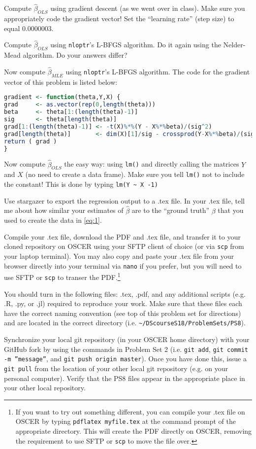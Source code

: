\documentclass[12pt,english]{exam}
\begin{document}
\begin{questions}
\question Compute $\hat{\beta}_{OLS}$ using gradient descent (as we went over in class). Make sure you appropriately code the gradient vector! Set the ``learning rate'' (step size) to equal 0.0000003.

\question Compute $\hat{\beta}_{OLS}$ using \texttt{nloptr}'s L-BFGS algorithm. Do it again using the Nelder-Mead algorithm. Do your answers differ?

\question Now compute $\hat{\beta}_{MLE}$ using \texttt{nloptr}'s L-BFGS algorithm. The code for the gradient vector of this problem is listed below:
\begin{lstlisting}[language=R]
gradient <- function(theta,Y,X) {
grad     <- as.vector(rep(0,length(theta)))
beta     <- theta[1:(length(theta)-1)]
sig      <- theta[length(theta)]
grad[1:(length(theta)-1)] <- -t(X)%*%(Y - X%*%beta)/(sig^2)
grad[length(theta)]       <- dim(X)[1]/sig - crossprod(Y-X%*%beta)/(sig^3)
return ( grad )
}
\end{lstlisting}

\question Now compute $\hat{\beta}_{OLS}$ the easy way: using \texttt{lm()} and directly calling the matrices $Y$ and $X$ (no need to create a data frame). Make sure you tell \texttt{lm()} not to include the constant! This is done by typing \texttt{lm(Y \textasciitilde{} X -1)}

Use stargazer to export the regression output to a .tex file. In your .tex file, tell me about how similar your estimates of $\hat{\beta}$ are to the ``ground truth'' $\beta$ that you used to create the data in \eqref{eq:1}.

\question Compile your .tex file, download the PDF and .tex file, and transfer it to your cloned repository on OSCER using your SFTP client of choice (or via \texttt{scp} from your laptop terminal). You may also copy and paste your .tex file from your browser directly into your terminal via \texttt{nano} if you prefer, but you will need to use SFTP or \texttt{scp} to transer the PDF.\footnote{If you want to try out something different, you can compile your .tex file on OSCER by typing \texttt{pdflatex myfile.tex} at the command prompt of the appropriate directory. This will create the PDF directly on OSCER, removing the requirement to use SFTP or \texttt{scp} to move the file over.}

\question You should turn in the following files: .tex, .pdf, and any additional scripts (e.g. .R, .py, or .jl) required to reproduce your work.  Make sure that these files each have the correct naming convention (see top of this problem set for directions) and are located in the correct directory (i.e. \texttt{\textasciitilde/DScourseS18/ProblemSets/PS8}).

\question Synchronize your local git repository (in your OSCER home directory) with your GitHub fork by using the commands in Problem Set 2 (i.e. \texttt{git add}, \texttt{git commit -m ''message''}, and \texttt{git push origin master}). Once you have done this, issue a \texttt{git pull} from the location of your other local git repository (e.g. on your personal computer). Verify that the PS8 files appear in the appropriate place in your other local repository.

\end{questions}
\end{document}
